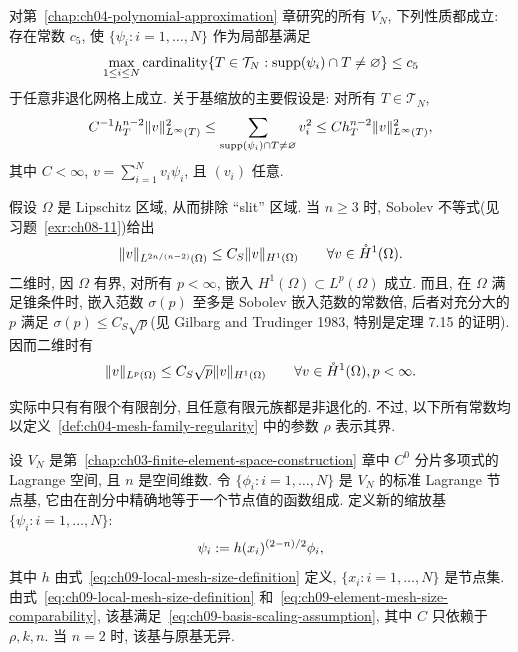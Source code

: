 对第~\ref{chap:ch04-polynomial-approximation} 章研究的所有 $V_N$, 下列性质都成立: 存在常数 $c_5$, 使 $\{\psi_i:i=1,\ldots,N\}$ 作为局部基满足
\begin{equation}
\MathBookFormulaID{formula-ch09-basis-local-cardinality}
\label{eq:ch09-basis-local-cardinality}
\max_{1\leq i\leq N}\operatorname{cardinality}
\{T\in\mathcal T_N:\operatorname{supp}(\psi_i)\cap T\neq\varnothing\}
\leq c_5
\end{equation}
于任意非退化网格上成立. 关于基缩放的主要假设是: 对所有 $T\in\mathcal T_N$,
\begin{equation}
\MathBookFormulaID{formula-ch09-basis-scaling-assumption}
\label{eq:ch09-basis-scaling-assumption}
C^{-1}h_T^{n-2}\|v\|_{L^\infty(T)}^2
\leq\sum_{\operatorname{supp}(\psi_i)\cap T\neq\varnothing}v_i^2
\leq Ch_T^{n-2}\|v\|_{L^\infty(T)}^2,
\end{equation}
其中 $C<\infty$, $v=\sum_{i=1}^Nv_i\psi_i$, 且 $(v_i)$ 任意.

假设 $\Omega$ 是 Lipschitz 区域, 从而排除 ``slit'' 区域. 当 $n\geq3$ 时, Sobolev 不等式(见习题~\ref{exr:ch08-11})给出
\begin{equation}
\MathBookFormulaID{formula-ch09-sobolev-n-ge-three}
\label{eq:ch09-sobolev-n-ge-three}
\|v\|_{L^{2n/(n-2)}(\Omega)}\leq C_S\|v\|_{H^1(\Omega)}
\qquad\forall v\in\mathring H^1(\Omega).
\end{equation}
二维时, 因 $\Omega$ 有界, 对所有 $p<\infty$, 嵌入 $H^1(\Omega)\subset L^p(\Omega)$ 成立. 而且, 在 $\Omega$ 满足锥条件时, 嵌入范数 $\sigma(p)$ 至多是 Sobolev 嵌入范数的常数倍, 后者对充分大的 $p$ 满足 $\sigma(p)\leq C_S\sqrt p$(见 Gilbarg and Trudinger 1983, 特别是定理 7.15 的证明). 因而二维时有
\begin{equation}
\MathBookFormulaID{formula-ch09-sobolev-two-dimensional}
\label{eq:ch09-sobolev-two-dimensional}
\|v\|_{L^p(\Omega)}\leq C_S\sqrt p\|v\|_{H^1(\Omega)}
\qquad\forall v\in\mathring H^1(\Omega), p<\infty.
\end{equation}

实际中只有有限个有限剖分, 且任意有限元族都是非退化的. 不过, 以下所有常数均以定义~\ref{def:ch04-mesh-family-regularity} 中的参数 $\rho$ 表示其界.

\begin{Example}
\label{ex:ch09-scaled-lagrange-basis}
设 $V_N$ 是第~\ref{chap:ch03-finite-element-space-construction} 章中 $C^0$ 分片多项式的 Lagrange 空间, 且 $n$ 是空间维数. 令 $\{\phi_i:i=1,\ldots,N\}$ 是 $V_N$ 的标准 Lagrange 节点基, 它由在剖分中精确地等于一个节点值的函数组成. 定义新的缩放基 $\{\psi_i:i=1,\ldots,N\}$:
\[
\MathBookFormulaID{formula-ch09-scaled-lagrange-basis}
\psi_i:=h(x_i)^{(2-n)/2}\phi_i,
\]
其中 $h$ 由式~\eqref{eq:ch09-local-mesh-size-definition} 定义, $\{x_i:i=1,\ldots,N\}$ 是节点集. 由式~\eqref{eq:ch09-local-mesh-size-definition} 和~\eqref{eq:ch09-element-mesh-size-comparability}, 该基满足~\eqref{eq:ch09-basis-scaling-assumption}, 其中 $C$ 只依赖于 $\rho,k,n$. 当 $n=2$ 时, 该基与原基无异.
\end{Example}

